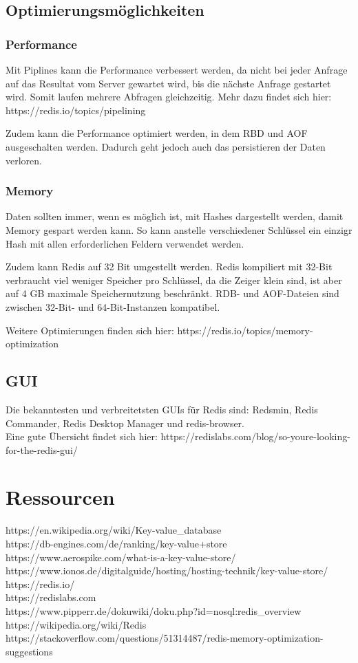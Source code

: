 \subsection{Optimierungsmöglichkeiten}
\subsubsection{Performance}
Mit Piplines kann die Performance verbessert werden, da nicht bei jeder Anfrage auf das Resultat vom Server gewartet wird, bis die nächste Anfrage gestartet wird. Somit laufen mehrere Abfragen gleichzeitig.
Mehr dazu findet sich hier: https://redis.io/topics/pipelining

Zudem kann die Performance optimiert werden, in dem RBD und AOF ausgeschalten werden. Dadurch geht jedoch auch das persistieren der Daten verloren.

\subsubsection{Memory}
Daten sollten immer, wenn es möglich ist, mit Hashes dargestellt werden, damit Memory gespart werden kann. So kann anstelle verschiedener Schlüssel ein einzigr Hash mit allen erforderlichen Feldern verwendet werden.

Zudem kann Redis auf 32 Bit umgestellt werden. Redis kompiliert mit 32-Bit verbraucht viel weniger Speicher pro Schlüssel, da die Zeiger klein sind, ist aber auf 4 GB maximale Speichernutzung beschränkt. RDB- und AOF-Dateien sind zwischen 32-Bit- und 64-Bit-Instanzen kompatibel.

Weitere Optimierungen finden sich hier: https://redis.io/topics/memory-optimization
\subsection{GUI}
Die bekanntesten und verbreitetsten GUIs für Redis sind: Redsmin, Redis Commander, Redis Desktop Manager und redis-browser.\\
Eine gute Übersicht findet sich hier: https://redislabs.com/blog/so-youre-looking-for-the-redis-gui/

\clearpage
\section{Ressourcen}
https://en.wikipedia.org/wiki/Key-value\_database\\
https://db-engines.com/de/ranking/key-value+store\\
https://www.aerospike.com/what-is-a-key-value-store/\\
https://www.ionos.de/digitalguide/hosting/hosting-technik/key-value-store/\\
https://redis.io/\\
https://redislabs.com\\
https://www.pipperr.de/dokuwiki/doku.php?id=nosql:redis\_overview\\
https://wikipedia.org/wiki/Redis\\
https://stackoverflow.com/questions/51314487/redis-memory-optimization-suggestions\\